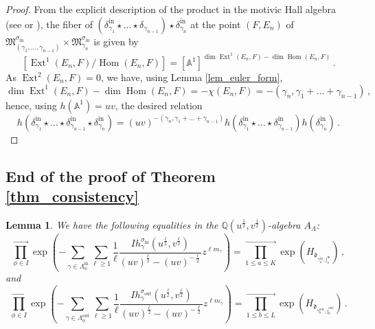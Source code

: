 \documentclass[12pt, a4paper]{amsart}
\newtheorem{lem}[defn]{Lemma}
\newcommand\A{\mathbb A}
\newcommand\Q{\mathbb Q}
\newcommand\fd{\mathfrak d}
\newcommand\fM{\mathfrak M}
\newcommand\Ext{\operatorname{Ext}}
\newcommand\Hom{\operatorname{Hom}}
\newcommand\iin{\mathrm{in}}
\newcommand\oout{\mathrm{out}}
\begin{document}
\begin{proof}
From the explicit description of the product in the motivic Hall algebra 
(see \cite[Proposition 6.2]{MR2854172}
or \cite[Corollary 5.15]{MR2303235}), the fiber of  $(\delta_{\gamma_1}^{\iin}
\star \dots \star \delta_{\gamma_{n-1}})\star \delta_{\gamma_n}^\iin$ at the point 
$(F,E_n)$ of $\fM_{(\gamma_1,\dots,\gamma_{n-1})}^{\sigma_\iin} \times \fM_{\gamma_n}^{\sigma_\iin}$ is given by 
\[ [\Ext^1(E_n,F)/\Hom(E_n,F)]=[\A^1]^{\dim \Ext^1(E_n,F)-\dim \Hom(E_n,F)}\,.\] 
As $\Ext^2(E_n,F)=0$, we have, using 
Lemma \ref{lem_euler_form}, 
\[ \dim \Ext^1(E_n,F)-\dim \Hom (E_n,F)
=-\chi(E_n,F)=-(\gamma_n, \gamma_1+\dots +\gamma_{n-1})\,,\]
hence, using 
$h(\A^1)=uv$, the desired relation
\[h(\delta_{\gamma_1}^{\iin}
\star \dots \star 
\delta_{\gamma_{n-1}}^\iin \star \delta_{\gamma_n}^{\iin})
=(uv)^{-(\gamma_n,\gamma_1+\dots+\gamma_{n-1})} h(\delta_{\gamma_1}^{\iin}
\star \dots \star 
\delta_{\gamma_{n-1}}^\iin)
h(\delta_{\gamma_n}^{\iin})\,.\]
\end{proof}







\subsection{End of the proof of Theorem \ref{thm_consistency}}
\label{section_proof_consistency}

\begin{lem} \label{lem_in_out}
We have the following equalities in the 
$\Q(u^{\frac{1}{2}}, v^{\frac{1}{2}})$-algebra $A_\Lambda$:
\[ \prod_{\phi \in I}^{\rightarrow}  \exp
\left(-\sum_{\gamma \in \Lambda_\phi^\iin} 
\sum_{\ell \geqslant 1} \frac{1}{\ell}
\frac{Ih_\gamma^{\sigma_{\iin}}(u^{\frac{\ell}{2}}, v^{\frac{\ell}{2}})}{(uv)^{\frac{\ell}{2}}-(uv)^{-\frac{\ell}{2}}} 
z^{\ell m_\gamma} \right)
= \prod_{1 \leqslant a \leqslant K}^{\rightarrow}
\exp \left(
H_{\fd_{\gamma_a^\iin, j_a^\iin}} \right) \,,\]
and 
\[ \prod_{\phi \in I}^{\rightarrow}  \exp
\left(- \sum_{\gamma \in \Lambda_\phi^\oout} 
\sum_{\ell \geqslant 1} \frac{1}{\ell}
\frac{Ih_\gamma^{\sigma_{\oout}}(u^{\frac{\ell}{2}}, v^{\frac{\ell}{2}})}{(uv)^{\frac{\ell}{2}}-(uv)^{-\frac{\ell}{2}}} 
z^{\ell m_\gamma} \right)
= \prod_{1 \leqslant b \leqslant L}^{\rightarrow}
\exp \left(
H_{\fd_{\gamma_b^\oout,j_b^\oout}} \right) \,.\]
\end{lem}
\end{document}
